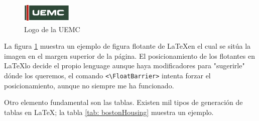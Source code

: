 \begin{figure}[ht!]
	\centering
	\includegraphics[width=\columnwidth]{Logo/uemc_logo.pdf}      
	\caption{Logo de la \gls{UEMC}}
	\label{fig: UEMC_logo}
\end{figure}
La figura \ref{fig: UEMC_logo} muestra un ejemplo de figura flotante de \LaTeX en el cual se sitúa la imagen en el margen superior de la página. El posicionamiento de los flotantes en \LaTeX lo decide el propio lenguage aunque haya modificadores para "sugerirle" dónde los queremos, el comando \verb_<\FloatBarrier>_ intenta forzar el posicionamiento, aunque no siempre me ha funcionado.

Otro elemento fundamental son las tablas. Existen mil tipos de generación de tablas en \LaTeX; la tabla \ref{tab: bostonHousing} muestra un ejemplo.

